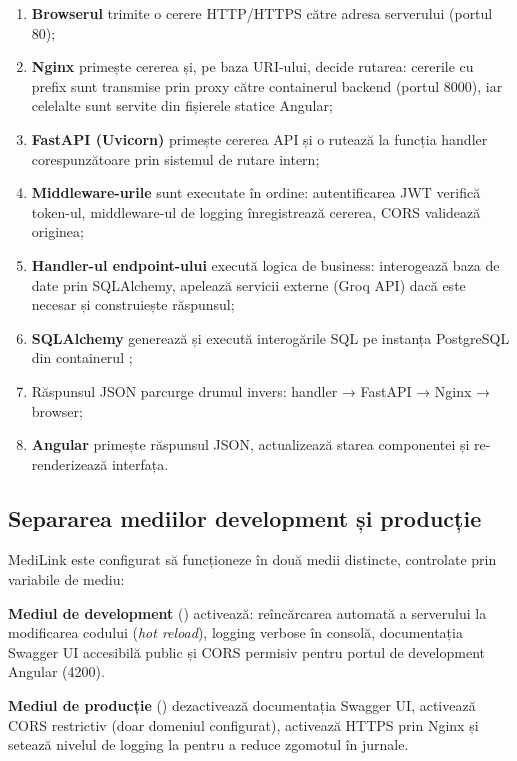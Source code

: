 \begin{enumerate}
  \item \textbf{Browserul} trimite o cerere HTTP/HTTPS către adresa serverului (portul 80);
  \item \textbf{Nginx} primește cererea și, pe baza URI-ului, decide rutarea: cererile cu prefix  sunt transmise prin proxy către containerul backend (portul 8000), iar celelalte sunt servite din fișierele statice Angular;
  \item \textbf{FastAPI (Uvicorn)} primește cererea API și o rutează la funcția handler corespunzătoare prin sistemul de rutare intern;
  \item \textbf{Middleware-urile} sunt executate în ordine: autentificarea JWT verifică token-ul, middleware-ul de logging înregistrează cererea, CORS validează originea;
  \item \textbf{Handler-ul endpoint-ului} execută logica de business: interogează baza de date prin SQLAlchemy, apelează servicii externe (Groq API) dacă este necesar și construiește răspunsul;
  \item \textbf{SQLAlchemy} generează și execută interogările SQL pe instanța PostgreSQL din containerul ;
  \item Răspunsul JSON parcurge drumul invers: handler → FastAPI → Nginx → browser;
  \item \textbf{Angular} primește răspunsul JSON, actualizează starea componentei și re-renderizează interfața.
\end{enumerate}

\subsection{Separarea mediilor development și producție}

MediLink este configurat să funcționeze în două medii distincte, controlate prin variabile de mediu:

\textbf{Mediul de development} () activează: reîncărcarea automată a serverului la modificarea codului (\textit{hot reload}), logging verbose în consolă, documentația Swagger UI accesibilă public și CORS permisiv pentru portul de development Angular (4200).

\textbf{Mediul de producție} () dezactivează documentația Swagger UI, activează CORS restrictiv (doar domeniul configurat), activează HTTPS prin Nginx și setează nivelul de logging la  pentru a reduce zgomotul în jurnale.
